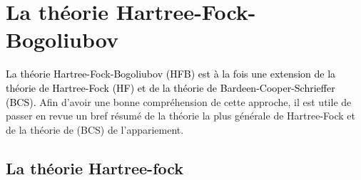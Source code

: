 \chapter{La théorie Hartree-Fock-Bogoliubov}

\textcolor{black}{ La théorie Hartree-Fock-Bogoliubov (HFB) est à la fois une extension de la théorie de
Hartree-Fock (HF) et de la théorie de Bardeen-Cooper-Schrieffer (BCS).}\textbf{ }Afin d'avoir une bonne compréhension
de cette approche, il est utile de passer en revue un bref résumé de la théorie la plus générale de Hartree-Fock et de
la théorie de (BCS) de l'appariement.

\section{La théorie Hartree-fock}

